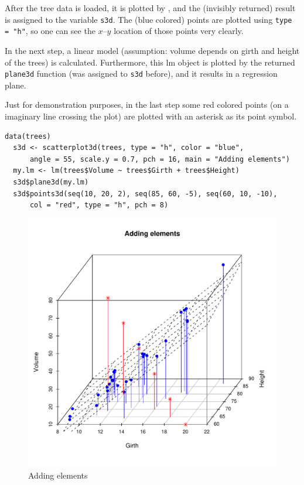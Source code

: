 After the tree data is loaded, it is plotted by \sdd ,
and the (invisibly returned) result is assigned to the variable {\tt s3d}.
The (blue colored) points are plotted using {\tt type = "h"},
so one can see the $x$--$y$ location of those points very clearly.

In the next step, a linear model (assumption: volume depends on girth and height of the trees) is calculated.
Furthermore, this \textsf{lm} object is plotted by the returned {\tt plane3d} function (was assigned to {\tt s3d} before),
and it results in a regression plane.

Just for demonstration purposes, in the last step some red colored points (on a imaginary line crossing the plot)
are plotted with an asterisk as its point symbol.

\vspace*{10mm}
\small
\begin{Verbatim}[frame=single]
  data(trees)
  s3d <- scatterplot3d(trees, type = "h", color = "blue",
      angle = 55, scale.y = 0.7, pch = 16, main = "Adding elements")
  my.lm <- lm(trees$Volume ~ trees$Girth + trees$Height)
  s3d$plane3d(my.lm)
  s3d$points3d(seq(10, 20, 2), seq(85, 60, -5), seq(60, 10, -10),
      col = "red", type = "h", pch = 8)
\end{Verbatim}
\normalsize

\clearpage
\begin{figure}[htb!]
\begin{center}
\includegraphics[width=13cm]{elements}
\end{center}
\vspace*{-10mm}\caption{Adding elements\label{elements}}
\end{figure}


